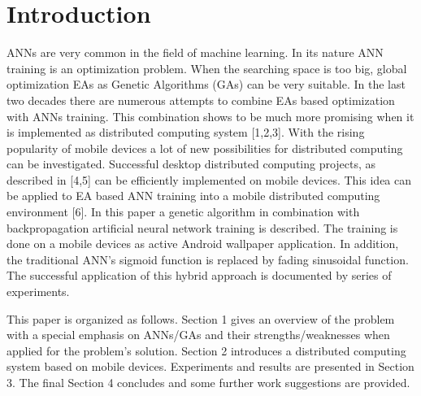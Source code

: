 \documentclass{llncs}
\begin{document}
\section{Introduction}
%
ANNs are very common in the field of machine learning. In its nature ANN training is an optimization problem. When the searching space is too big, global optimization EAs as Genetic Algorithms (GAs) can be very suitable. In the last two decades there are numerous attempts to combine EAs based optimization with ANNs training. This combination shows to be much more promising when it is implemented as distributed computing system [1,2,3]. With the rising popularity of mobile devices a lot of new possibilities for distributed computing can be investigated. Successful desktop distributed computing projects, as described in [4,5] can be efficiently implemented on mobile devices. This idea can be applied to EA based ANN training into a mobile distributed computing environment [6]. In this paper a genetic algorithm in combination with backpropagation artificial neural network training is described. The training is done on a mobile devices as active Android wallpaper application. In addition, the traditional ANN's sigmoid function is replaced by fading sinusoidal function. The successful application of this hybrid approach is documented by series of experiments.

This paper is organized as follows. Section 1 gives an overview of the problem  with a special emphasis on ANNs/GAs and their strengths/weaknesses when applied for the problem's solution. Section 2 introduces a distributed computing system based on mobile devices. Experiments and results are presented in Section 3. The final Section 4 concludes and some further work suggestions are provided. 
%
\end{document}
